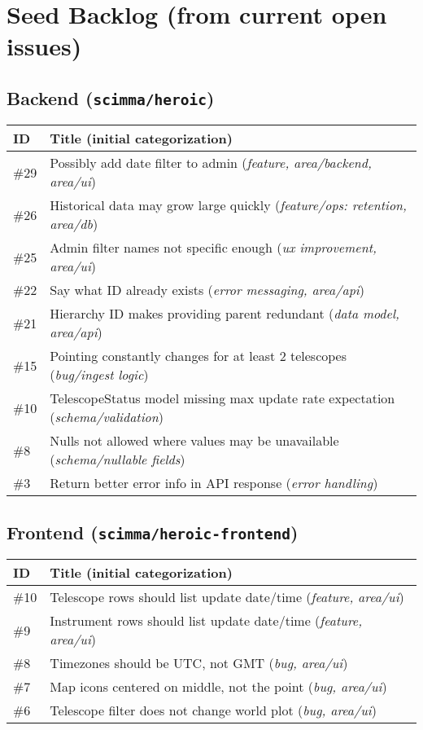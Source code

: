 \documentclass[11pt]{article}
\begin{document}
\section{Seed Backlog (from current open issues)}
\subsection*{Backend (\texttt{scimma/heroic})}
\begin{longtable}{@{}p{1.5cm}p{11.8cm}@{}}
\toprule
\textbf{ID} & \textbf{Title (initial categorization)} \\ \midrule
\#29 & Possibly add date filter to admin (\textit{feature, area/backend, area/ui}) \\
\#26 & Historical data may grow large quickly (\textit{feature/ops: retention, area/db}) \\
\#25 & Admin filter names not specific enough (\textit{ux improvement, area/ui}) \\
\#22 & Say what ID already exists (\textit{error messaging, area/api}) \\
\#21 & Hierarchy ID makes providing parent redundant (\textit{data model, area/api}) \\
\#15 & Pointing constantly changes for at least 2 telescopes (\textit{bug/ingest logic}) \\
\#10 & TelescopeStatus model missing max update rate expectation (\textit{schema/validation}) \\
\#8  & Nulls not allowed where values may be unavailable (\textit{schema/nullable fields}) \\
\#3  & Return better error info in API response (\textit{error handling}) \\
\bottomrule
\end{longtable}

\subsection*{Frontend (\texttt{scimma/heroic-frontend})}
\begin{longtable}{@{}p{1.5cm}p{11.8cm}@{}}
\toprule
\textbf{ID} & \textbf{Title (initial categorization)} \\ \midrule
\#10 & Telescope rows should list update date/time (\textit{feature, area/ui}) \\
\#9  & Instrument rows should list update date/time (\textit{feature, area/ui}) \\
\#8  & Timezones should be UTC, not GMT (\textit{bug, area/ui}) \\
\#7  & Map icons centered on middle, not the point (\textit{bug, area/ui}) \\
\#6  & Telescope filter does not change world plot (\textit{bug, area/ui}) \\
\bottomrule
\end{longtable}
\end{document}
